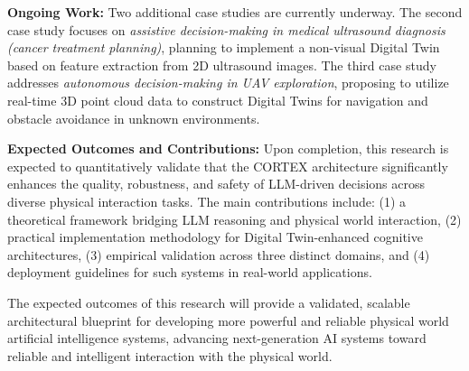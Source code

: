 \textbf{Ongoing Work:} Two additional case studies are currently underway. The second case study focuses on \textit{assistive decision-making in medical ultrasound diagnosis (cancer treatment planning)}, planning to implement a non-visual Digital Twin based on feature extraction from 2D ultrasound images. The third case study addresses \textit{autonomous decision-making in UAV exploration}, proposing to utilize real-time 3D point cloud data to construct Digital Twins for navigation and obstacle avoidance in unknown environments.

\textbf{Expected Outcomes and Contributions:} Upon completion, this research is expected to quantitatively validate that the CORTEX architecture significantly enhances the quality, robustness, and safety of LLM-driven decisions across diverse physical interaction tasks. The main contributions include: (1) a theoretical framework bridging LLM reasoning and physical world interaction, (2) practical implementation methodology for Digital Twin-enhanced cognitive architectures, (3) empirical validation across three distinct domains, and (4) deployment guidelines for such systems in real-world applications.

The expected outcomes of this research will provide a validated, scalable architectural blueprint for developing more powerful and reliable physical world artificial intelligence systems, advancing next-generation AI systems toward reliable and intelligent interaction with the physical world.